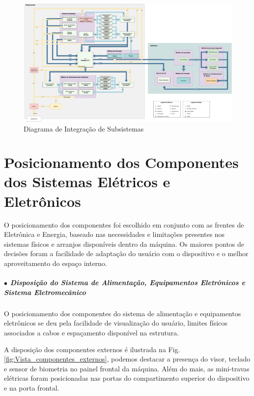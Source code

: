 \begin{landscape}
\begin{figure}[!htb]
    \centering
    \vspace{1cm}
    \hspace{-2cm}
    \includegraphics[width=1.5\textwidth, height=2\textheight,keepaspectratio]{figuras/integracao/integracao_geral.pdf}
    \vspace{-5pt}
    \caption{Diagrama de Integração de Subsistemas}
    \label{fig:arq_integracao}
\end{figure}
\end{landscape}


\section{Posicionamento dos Componentes dos Sistemas Elétricos e Eletrônicos}
\label{pos_compontes}

O posicionamento dos componentes foi escolhido em conjunto com as frentes de Eletrônica e Energia, baseado nas necessidades e limitações presentes nos sistemas físicos e arranjos disponíveis dentro da máquina. Os maiores pontos de decisões foram a facilidade de adaptação do usuário com o dispositivo e o melhor aproveitamento do espaço interno.

\subparagraph*{$\bullet$ Disposição do Sistema de Alimentação, Equipamentos Eletrônicos e Sistema Eletromecânico} \hfill

O posicionamento dos componentes do sistema de alimentação e equipamentos eletrônicos se deu pela facilidade de visualização do usuário, limites físicos associados a cabos e espaçamento disponível na estrutura.  

A disposição dos componentes externos é ilustrada na Fig. \ref{fig:Vista_componentes_externos}, podemos destacar a presença do visor, teclado e sensor de biometria no painel frontal da máquina. Além do mais, as mini-travas elétricas foram posicionadas nas portas do compartimento superior do dispositivo e na porta frontal.

